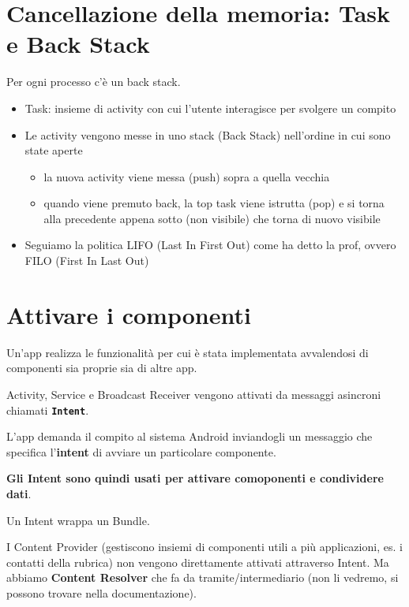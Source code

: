 \section{Cancellazione della memoria: Task e Back Stack}
\par Per ogni processo c'è un back stack.
\begin{itemize}
    \item Task: insieme di activity con cui l'utente interagisce per svolgere un compito
    \item Le activity vengono messe in uno stack (Back Stack) nell'ordine in cui sono state aperte
    \begin{itemize}
        \item la nuova activity viene messa (push) sopra a quella vecchia
        \item quando viene premuto back, la top task viene istrutta (pop) e si torna alla precedente appena sotto (non visibile) che torna di nuovo visibile
    \end{itemize}
    \item Seguiamo la politica LIFO (Last In First Out) come ha detto la prof, ovvero FILO (First In Last Out)
\end{itemize}




\section{Attivare i componenti}
\par Un'app realizza le funzionalità per cui è stata implementata avvalendosi di componenti sia proprie sia di altre app.
\par Activity, Service e Broadcast Receiver vengono attivati da messaggi asincroni chiamati \textbf{\texttt{Intent}}.
\par L'app demanda il compito al sistema Android inviandogli un messaggio che specifica l'\textbf{intent} di avviare un particolare componente.
\par \textbf{Gli Intent sono quindi usati per attivare comoponenti e condividere dati}.
\par Un Intent wrappa un Bundle.
\par I Content Provider (gestiscono insiemi di componenti utili a più applicazioni, es. i contatti della rubrica) non vengono direttamente attivati attraverso Intent. Ma abbiamo \textbf{Content Resolver} che fa da tramite/intermediario (non li vedremo, si possono trovare nella documentazione).

